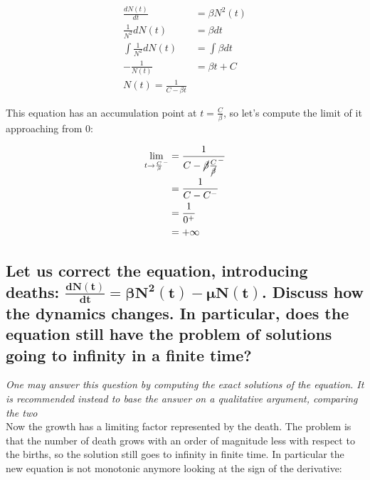   \begin{align*}
    \frac{dN(t)}{dt} &= \beta N^2(t)\\
    \frac{1}{N^2}dN(t) &= \beta dt\\
    \int\frac{1}{N^2}dN(t) &= \int\beta dt\\
    -\frac{1}{N(t)} &= \beta t + C\\
    N(t) = \frac{1}{C-\beta t}
  \end{align*}

  This equation has an accumulation point at $t = \frac{C}{\beta}$, so let's compute the limit of it approaching from $0$:

  \begin{align*}
    \lim\limits_{t\to\frac{C}{\beta}^-} &= \frac{1}{C-\cancel{\beta}\frac{C}{\cancel{\beta}}^-}\\
                                        &=\frac{1}{C-C^-}\\
                                        &=\frac{1}{0^+}\\
                                        &=+\infty
  \end{align*}


  \subsection{Let us correct the equation, introducing deaths: $\mathbf{\frac{dN(t)}{dt} = \beta N^2(t)-\mu N(t)}$. Discuss how the dynamics changes. In particular, does the equation still have the problem of solutions going to infinity in a finite time?}
  \textit{One may answer this question by computing the exact solutions of the equation. It is recommended instead to base the answer on a qualitative argument, comparing the two}\\
  Now the growth has a limiting factor represented by the death.
  The problem is that the number of death grows with an order of magnitude less with respect to the births, so the solution still goes to infinity in finite time.
  In particular the new equation is not monotonic anymore looking at the sign of the derivative:


  \begin{figure}[H]
    \centering
  \end{figure}

